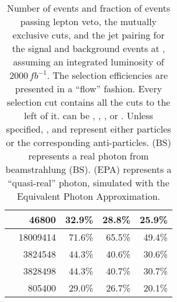\begin{table}[!tbp]
\begin{tabular}{lrrrr}
\egamma{\Pepm}{\Pphoton}{\EPA}{\Pquark \Pquark \PHiggs \Pnu} & 46800 & 32.9\% &28.8\% & 25.9\% \\
\hline
\gammagamma{\Pphoton}{\BS}{\Pphoton}{\BS}{ \Pquark \Pquark \Pquark \Pquark}& 18009414  & 71.6\%& 65.5\%& 49.4\%\\
\gammagamma{\Pphoton}{\BS}{\Pphoton}{\EPA}{ \Pquark \Pquark \Pquark \Pquark}& 3824548  &44.3\%& 40.6\%& 30.6\%\\
\gammagamma{\Pphoton}{\EPA}{\Pphoton}{\BS}{ \Pquark \Pquark \Pquark \Pquark}& 3828498 & 44.3\%& 40.7\%& 30.7\%\\
\gammagamma{\Pphoton}{\EPA}{\Pphoton}{\EPA}{ \Pquark \Pquark \Pquark \Pquark}& 805400 & 29.0\% & 26.7\% & 20.1\%\\
\hline \hline
\end{tabular}

\caption
{Number of events and fraction of events passing lepton veto, the mutually exclusive cuts, and the jet pairing  for the signal and background events at , assuming an integrated luminosity of 2000\,$fb^{-1}$. The selection efficiencies are presented in a ``flow'' fashion. Every selection cut contains all the cuts to the left of it. \Pquark can be \Pup, \Pdown, \Pstrange, \Pbottom or \Ptop. Unless specified, \Pquark, \Plepton and \Pnu represent either particles or the corresponding anti-particles. \Pphoton(BS) represents a real photon from beamstrahlung (BS). \Pphoton(EPA) represents a ``quasi-real'' photon, simulated with the Equivalent Photon Approximation.
}
\label{tab:doubleHiggs3TeVPreslection}
\end{table}



